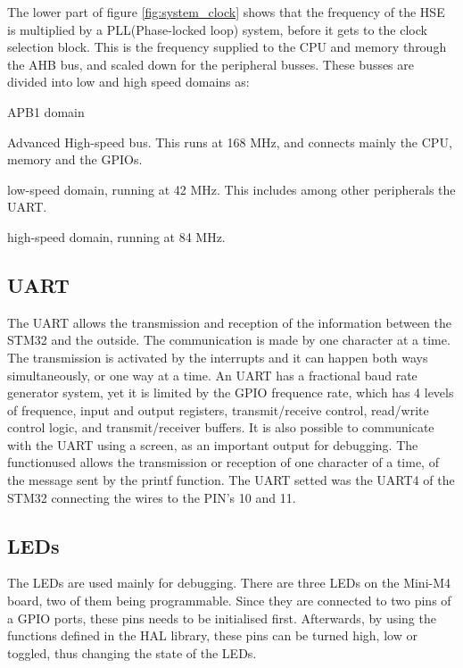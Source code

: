 The lower part of figure \ref{fig:system_clock} shows that the frequency
of the HSE is multiplied by a PLL(Phase-locked loop) system, before it gets
to the clock selection block. This is the frequency supplied to
the CPU and memory through the AHB bus, and scaled down for the peripheral busses. These busses are divided into low and high speed domains as:

\begin{labeling}{APB1 domain}
	\item[\textbf{AHB}]
		Advanced High-speed bus. This runs at 168 MHz, and connects
		mainly the CPU, memory and the GPIOs.
	\item[\textbf{APB1 domain}]
		low-speed domain, running at 42 MHz. This includes among other 
		peripherals the UART.		
	\item[\textbf{APB2 domain}]
		high-speed domain, running at 84 MHz.
	\end{labeling}

\subsection{UART}
The UART allows the transmission and reception of the information between the STM32 and the outside. The 
communication is made by one character at a time. The transmission is activated by the interrupts and it 
can happen both ways simultaneously, or one way at a time. An UART has a fractional baud rate generator 
system, yet it is limited by the GPIO frequence rate, which has 4 levels of frequence, input and output 
registers, transmit/receive control, read/write control logic, and transmit/receiver buffers. It is also 
possible to communicate with the UART using a screen, as an important output for debugging. The 
functionused allows the transmission or reception of one character of a time, of the message sent by the 
printf function. The UART setted was the UART4 of the STM32 connecting the wires to the PIN's 10 and 11.

\subsection{LEDs}
The LEDs are used mainly for debugging. There are three LEDs on the 
Mini-M4 board, two of them being programmable. Since they are connected
to two pins of a GPIO ports, these pins needs to be initialised first.
Afterwards, 
by using the functions defined in the HAL library, these pins can be 
turned high, low or toggled, thus changing the state of the LEDs.

